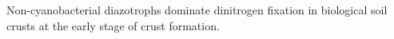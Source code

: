 Non-cyanobacterial diazotrophs dominate dinitrogen fixation in biological soil crusts at the early stage of crust formation.
